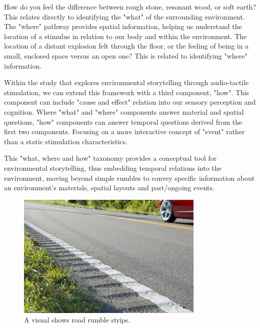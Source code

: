             How do you feel the difference between rough stone, resonant wood, or soft earth? This relates directly to identifying the "what" of the surrounding environment. The "where" pathway provides spatial information, helping us understand the location of a stimulus in relation to our body and within the environment. The location of a distant explosion felt through the floor, or the feeling of being in a small, enclosed space versus an open one? This is related to identifying "where" information.\par

            Within the study that explores environmental storytelling through audio-tactile stimulation, we can extend this framework with a third component, "how". This component can include "cause and effect" relation into our sensory perception and cognition. Where "what" and "where" components answer material and spatial questions, "how" components can answer temporal questions derived from the first two components. Focusing on a more interactive concept of "event" rather than a static stimulation characteristics.\par

            This "what, where and how" taxonomy provides a conceptual tool for environmental storytelling, thus embedding temporal relations into the environment, moving beyond simple rumbles to convey specific information about an environment's materials, spatial layouts and past/ongoing events.\par

            \begin{figure}[H]
                \centering
                \includegraphics[width=0.8\textwidth]{images/rumble_strips.jpg}
                \caption{A visual shows road rumble strips.}
                \label{fig:RUMBLE_STRIP}
            \end{figure}

